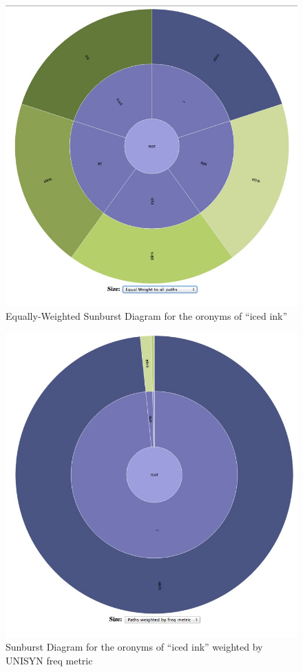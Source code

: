 \begin{figure}
\includegraphics[width=150mm]{iStink_EqualWeight.jpg}
\captionfonts
\caption[Equally-Weighted Sunburst Diagram for the oronyms of ``iced ink'']{Equally-Weighted Sunburst Diagram for the oronyms of ``iced ink''}
\label{fig:oronymsunburst:iStinkEqualWeight}
\end{figure}


\begin{figure}
\includegraphics[width=150mm]{iStink_Weighted.jpg}
\captionfonts
\caption[Sunburst Diagram for the oronyms of ``iced ink'' weighted by UNISYN freq metric]{Sunburst Diagram for the oronyms of ``iced ink'' weighted by UNISYN freq metric }
\label{fig:oronymsunburst:iStinkUNISYNWeight}
\end{figure}

